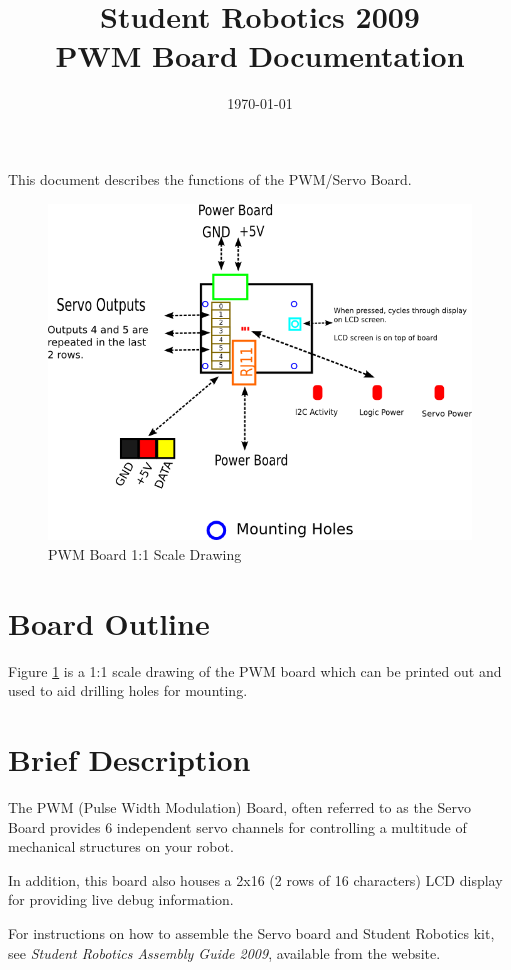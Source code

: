 \documentclass[a4paper, 12pt]{article}
\title {Student Robotics 2009\\ PWM Board Documentation}
\date{\today}
\begin{document}
\maketitle

\noindent This document describes the functions of the PWM/Servo Board. 

\begin{figure}
\centering
\includegraphics[scale=1, angle=90]{outline}
\caption{PWM Board 1:1 Scale Drawing}
\label{fig:outline}
\end{figure}


\section{Board Outline}
Figure \ref{fig:outline} is a 1:1 scale drawing of the PWM board which can be printed out and used to aid drilling holes for mounting.
\label{sec:outline}

\section{Brief Description}

The PWM (Pulse Width Modulation) Board, often referred to as the Servo Board provides 6 independent servo channels for controlling a multitude of mechanical structures on your robot. 

In addition, this board also houses a 2x16 (2 rows of 16 characters) LCD display for providing live debug information.


For instructions on how to assemble the Servo board and Student Robotics kit, see \textit{Student Robotics Assembly Guide 2009}, available from the website.
\end{document}
